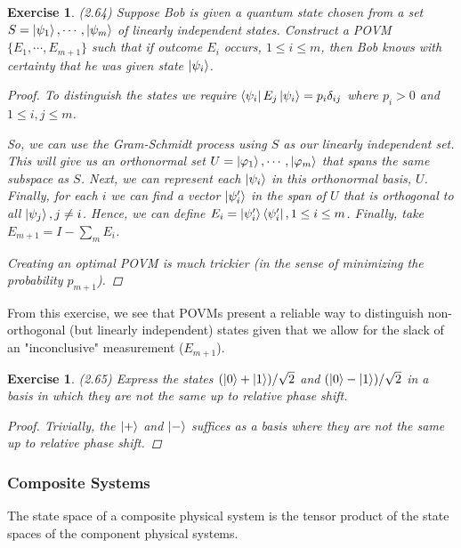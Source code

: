 \documentclass[11pt]{article}
\newcommand\0{\mathbf{0}}
\newcommand\<{\langle}
\renewcommand\>{\rangle}
\renewcommand\phi{\varphi}
\newtheorem{exercise}[theorem]{Exercise}
\begin{document}
\begin{exercise} (2.64) Suppose Bob is given a quantum state chosen from a set $S = \ket{\psi_1} , \cdots , \ket{\psi_m}$ of linearly independent states. Construct a POVM $\{ E_1 , \cdots , E_{m+1} \}$ such that if outcome $E_i$ occurs, $1 \leq i \leq m$, then Bob knows with certainty that he was given state $\ket{\psi_i}$.

\begin{proof}
	To distinguish the states we require $\bra{\psi_i} E_j \ket{\psi_i} = p_i \delta_{ij}$ where $p_i > 0$ and $1 \leq i,j \leq m$. 

So, we can use the Gram-Schmidt process using $S$ as our linearly independent set. This will give us an orthonormal set $U = \ket{\phi_1} , \cdots , \ket{\phi_m}$ that spans the same subspace as $S$. Next, we can represent each $\ket{\psi_i}$ in this orthonormal basis, $U$. Finally, for each $i$ we can find a vector $\ket{\psi'_i}$ in the span of $U$ that is orthogonal to all $\ket{\psi_j}, j \neq i$. Hence, we can define $E_i = \ket{\psi_i'} \bra{\psi_i'}, 1 \leq i \leq m$. Finally, take $E_{m+1} = I - \sum_m E_i$. 

Creating an optimal POVM is much trickier (in the sense of minimizing the probability $p_{m+1}$).
\end{proof}
\end{exercise}

From this exercise, we see that POVMs present a reliable way to distinguish non-orthogonal (but linearly independent) states given that we allow for the slack of an "inconclusive" measurement ($E_{m+1}$). 

\begin{exercise} (2.65) Express the states $(\ket{0} + \ket{1})/\sqrt{2}$ and $(\ket{0} - \ket{1})/\sqrt{2}$ in a basis in which they are not the same up to relative phase shift.

\begin{proof}
Trivially, the $\ket{+}$ and $\ket{-}$ suffices as a basis where they are not the same up to relative phase shift.	
\end{proof}

	
\end{exercise}

\subsubsection{Composite Systems}

The state space of a composite physical system is the tensor product of the state spaces of the component physical systems. 
\end{document}
